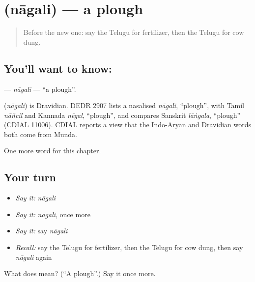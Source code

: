 \section[\texorpdfstring{\te{నాగలి} (nāgali)}{నాగలి (nāgali)}]{ (nāgali) — a plough}

\label{lesson:TE-C234-nagali}



\begin{quote}
Before the new one: say the Telugu for fertilizer, then the Telugu for cow dung.
\end{quote}

\subsection*{You'll want to know: }
\textbf{} — \emph{nāgali} — \textquotedblleft{}a plough\textquotedblright{}.

\begin{cousinweb}
\textbf{} (\emph{nāgali}) is Dravidian. DEDR 2907 lists a nasalised \emph{nāgali}, \textquotedblleft{}plough\textquotedblright{}, with Tamil \emph{nāñcil} and Kannada \emph{nēgal}, \textquotedblleft{}plough\textquotedblright{}, and compares Sanskrit \emph{lāṅgala}, \textquotedblleft{}plough\textquotedblright{} (CDIAL 11006). CDIAL reports a view that the Indo-Aryan and Dravidian words both come from Munda.
\end{cousinweb}

\begin{grammarlens}[title={What you've built}]
One more word for this chapter.
\end{grammarlens}

\subsection*{Your turn}
\begin{itemize}
\raggedright
  \item \emph{Say it:} \emph{nāgali}
  \item \emph{Say it:} \emph{nāgali}, once more
  \item \emph{Say it:} say \emph{nāgali}
  \item \emph{Recall:} say the Telugu for fertilizer, then the Telugu for cow dung, then say \emph{nāgali} again
\end{itemize}

\begin{tcolorbox}[breakable,colback=teal!4,colframe=teal!35!black,title={Before you move on}]
What does  mean? (\textquotedblleft{}A plough\textquotedblright{}.) Say it once more.
\end{tcolorbox}
